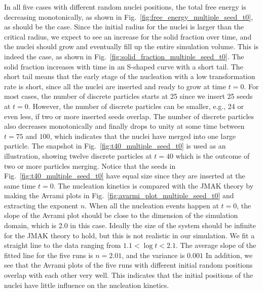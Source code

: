 \documentclass[preprint,12pt]{elsarticle}
\begin{document}
In all five cases with different random nuclei positions, the total free energy is decreasing monotonically, as shown in Fig.~\ref{fig:free_energy_multiple_seed_t0}, as should be the case.  Since the initial radius for the nuclei is larger than the critical radius, we expect to see an increase for the solid fraction over time, and the nuclei should grow and eventually fill up the entire simulation volume. This is indeed the case, as shown in Fig.~\ref{fig:solid_fraction_multiple_seed_t0}. The solid fraction increases with time in an S-shaped curve with a short tail. The short tail means that the early stage of the nucleation with a low transformation rate is short, since all the nuclei are inserted and ready to grow at time $t=0$. For most cases, the number of discrete particles starts at 25 since we insert 25 seeds at $t=0$. However, the number of discrete particles can be smaller, e.g., 24 or even less, if two or more inserted seeds overlap. The number of discrete particles also decreases monotonically and finally drops to unity at some time between $t=75$ and $100$, which indicates that the nuclei have merged into one large particle. The snapshot in Fig.~\ref{fig:t40_multiple_seed_t0} is used as an illustration, showing twelve discrete particles at $t=40$ which is the outcome of two or more particles merging. Notice that the seeds in Fig.~\ref{fig:t40_multiple_seed_t0} have equal size since they are inserted at the same time $t=0$. The nucleation kinetics is compared with the JMAK theory by making the Avrami plots in Fig.~\ref{fig:avarmi_plot_multiple_seed_t0} and extracting the exponent $n$. %
When all the nucleation events happen at $t=0$, the slope of the Avrami plot should be close to the dimension of the simulation domain, which is 2.0 in this case. Ideally the size of the system should be infinite for the JMAK theory to hold, but this is not realistic in our simulation. We fit a straight line to the data ranging from $1.1 < \log t < 2.1$. The average slope of the fitted line for the five runs is $n=2.01$, and the variance is $0.001$ %
In addition, we see that the Avrami plots of the five runs with different initial random positions overlap with each other very well. This indicates that the initial positions of the nuclei have little influence on the nucleation kinetics. 
\end{document}
